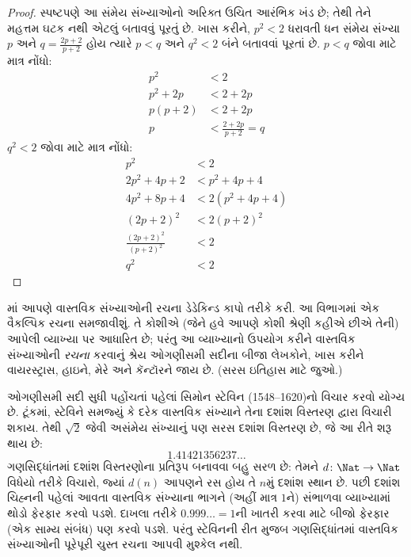 \begin{proof}
સ્પષ્ટપણે આ સંમેય સંખ્યાઓનો અરિક્ત ઉચિત આરંભિક ખંડ છે; તેથી તેને
મહત્તમ ઘટક નથી એટલું બતાવવું પૂરતું છે. ખાસ કરીને, $p^2 < 2$ ધરાવતી
ધન સંમેય સંખ્યા $p$ અને $q = \frac{2p+2}{p+2}$ હોય ત્યારે $p < q$ અને
$q^2 < 2$ બંને બતાવવાં પૂરતાં છે. $p < q$ જોવા માટે માત્ર નોંધો:
\begin{align*}
	p^2 &< 2\\
	p^2 + 2p &< 2 + 2p\\
	p(p + 2) &< 2 + 2p\\
	p &< \tfrac{2+2p}{p+2} = q
\end{align*}
$q^2 < 2$ જોવા માટે માત્ર નોંધો:
\begin{align*}
	p^2 &< 2\\
	2p^2 + 4p + 2 &< p^2 + 4p+ 4\\
	4p^2 + 8p + 4 &< 2(p^2 + 4p + 4)\\
	(2p+2)^2 & <2(p+2)^2\\
	\tfrac{(2p+2)^2}{(p+2)^2} &< 2\\
	q^2 &< 2
\end{align*}
\end{proof}
\endgroup

\begingroup
\makeatletter{}\makeatother


\label{guunit:OLP-0048}


માં આપણે વાસ્તવિક સંખ્યાઓની રચના ડેડેકિન્ડ કાપો
તરીકે કરી. આ વિભાગમાં એક વૈકલ્પિક રચના સમજાવીશું. તે કોશીએ
(જેને હવે આપણે કોશી શ્રેણી કહીએ છીએ તેની) આપેલી વ્યાખ્યા પર આધારિત
છે; પરંતુ આ વ્યાખ્યાનો ઉપયોગ કરીને વાસ્તવિક સંખ્યાઓની \emph{રચના}
કરવાનું શ્રેય ઓગણીસમી સદીના બીજા લેખકોને, ખાસ કરીને વાયરસ્ટ્રાસ,
હાઇને, મેરે અને કૅન્ટૉરને જાય છે. (સરસ ઇતિહાસ માટે
\citeauthor{OConnorRobertson:RN} \citeyear{OConnorRobertson:RN} જુઓ.)

ઓગણીસમી સદી સુધી પહોંચતાં પહેલાં સિમોન સ્ટેવિન (1548--1620)નો વિચાર
કરવો યોગ્ય છે. ટૂંકમાં, સ્ટેવિને સમજ્યું કે દરેક વાસ્તવિક સંખ્યાને
તેના દશાંશ વિસ્તરણ દ્વારા વિચારી શકાય. તેથી $\sqrt{2}$ જેવી અસંમેય
સંખ્યાનું પણ સરસ દશાંશ વિસ્તરણ છે, જે આ રીતે શરૂ થાય છે:
\[
	1.41421356237\ldots
\]
ગણસિદ્ધાંતમાં દશાંશ વિસ્તરણોના પ્રતિરૂપ બનાવવા બહુ સરળ છે: તેમને
$d \colon \Nat \to \Nat$ વિધેયો તરીકે વિચારો, જ્યાં $d(n)$ આપણને
રસ હોય તે $n$મું દશાંશ સ્થાન છે. પછી દશાંશ ચિહ્નની પહેલાં આવતા
વાસ્તવિક સંખ્યાના ભાગને (અહીં માત્ર $1$ને) સંભાળવા વ્યાખ્યામાં થોડો
ફેરફાર કરવો પડશે. દાખલા તરીકે $0.999\ldots = 1$ની ખાતરી કરવા માટે
બીજો ફેરફાર (એક સામ્ય સંબંધ) પણ કરવો પડશે. પરંતુ સ્ટેવિનની રીત મુજબ
ગણસિદ્ધાંતમાં વાસ્તવિક સંખ્યાઓની પૂરેપૂરી ચુસ્ત રચના આપવી મુશ્કેલ નથી.

